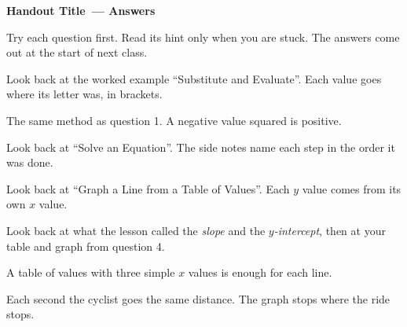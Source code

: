 \documentclass[11pt]{article}
\newcommand{\handouttitle}{Handout Title}
\newif\ifhints
\newcommand{\hint}[2]{\item[Question #1] #2}
\newcommand{\doctitle}{\handouttitle\ --- Answers}
\newcommand{\doctitle}{\handouttitle\ --- Hints}
\newcommand{\doctitle}{\handouttitle}
\begin{document}
\ifhints
{\LARGE\bfseries\sffamily \doctitle}\par
\medskip
{\color{why} Try each question first. Read its hint only when you are stuck.
The answers come out at the start of next class.}
\begin{description}[leftmargin=6.5em, style=nextline, itemsep=0.8em]
  \hint{1}{Look back at the worked example ``Substitute and Evaluate''. Each value goes where its letter was, in brackets.}
  \hint{2}{The same method as question 1. A negative value squared is positive.}
  \hint{3}{Look back at ``Solve an Equation''. The side notes name each step in the order it was done.}
  \hint{4}{Look back at ``Graph a Line from a Table of Values''. Each $y$ value comes from its own $x$ value.}
  \hint{5}{Look back at what the lesson called the \emph{slope} and the \emph{$y$-intercept}, then at your table and graph from question 4.}
  \hint{6}{A table of values with three simple $x$ values is enough for each line.}
  \hint{7}{Each second the cyclist goes the same distance. The graph stops where the ride stops.}
\end{description}
\end{document}
